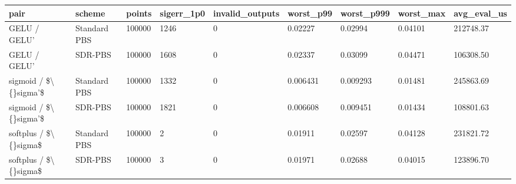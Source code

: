 \small
\setlength{\tabcolsep}{4pt}
\begin{tabular}{lllllllll}
\toprule
pair & scheme & points & sigerr\_1p0 & invalid\_outputs & worst\_p99 & worst\_p999 & worst\_max & avg\_eval\_us \\
\midrule
GELU / GELU' & Standard PBS & 100000 & 1246 & 0 & 0.02227 & 0.02994 & 0.04101 & 212748.37 \\
GELU / GELU' & SDR-PBS & 100000 & 1608 & 0 & 0.02337 & 0.03099 & 0.04471 & 106308.50 \\
sigmoid / \$\textbackslash\{\}sigma'\$ & Standard PBS & 100000 & 1332 & 0 & 0.006431 & 0.009293 & 0.01481 & 245863.69 \\
sigmoid / \$\textbackslash\{\}sigma'\$ & SDR-PBS & 100000 & 1821 & 0 & 0.006608 & 0.009451 & 0.01434 & 108801.63 \\
softplus / \$\textbackslash\{\}sigma\$ & Standard PBS & 100000 & 2 & 0 & 0.01911 & 0.02597 & 0.04128 & 231821.72 \\
softplus / \$\textbackslash\{\}sigma\$ & SDR-PBS & 100000 & 3 & 0 & 0.01971 & 0.02688 & 0.04015 & 123896.70 \\
\bottomrule
\end{tabular}
